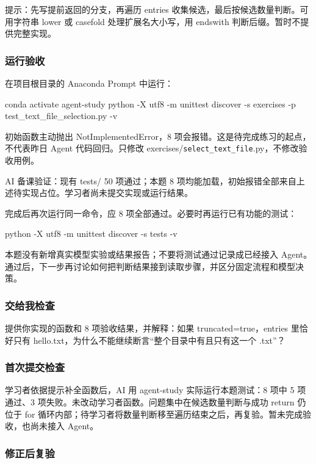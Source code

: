 \documentclass[UTF8,zihao=-4,fontset=fandol]{ctexart}
\begin{document}
提示：先写提前返回的分支，再遍历 entries 收集候选，最后按候选数量判断。可用字符串 lower 或 casefold 处理扩展名大小写，用 endswith 判断后缀。暂时不提供完整实现。

\subsubsection{运行验收}

在项目根目录的 Anaconda Prompt 中运行：

\begin{Code}
conda activate agent-study
python -X utf8 -m unittest discover -s exercises -p test_text_file_selection.py -v
\end{Code}

初始函数主动抛出 NotImplementedError，8 项会报错。这是待完成练习的起点，不代表昨日 Agent 代码回归。只修改 exercises/\nolinkurl{select_text_file}.py，不修改验收用例。

AI 备课验证：现有 tests/ 50 项通过；本题 8 项均能加载，初始报错全部来自上述待实现占位。学习者尚未提交实现或运行结果。

完成后再次运行同一命令，应 8 项全部通过。必要时再运行已有功能的测试：

\begin{Code}
python -X utf8 -m unittest discover -s tests -v
\end{Code}

本题没有新增真实模型实验或结果报告；不要将测试通过记录成已经接入 Agent。通过后，下一步再讨论如何把判断结果接到读取步骤，并区分固定流程和模型决策。

\subsubsection{交给我检查}

提供你实现的函数和 8 项验收结果，并解释：如果 truncated=true，entries 里恰好只有 hello.txt，为什么不能继续断言“整个目录中有且只有这一个 .txt”？

\subsubsection{首次提交检查}

学习者依据提示补全函数后，AI 用 agent-study 实际运行本题测试：8 项中 5 项通过、3 项失败。未改动学习者函数。问题集中在候选数量判断与成功 return 仍位于 for 循环内部；待学习者将数量判断移至遍历结束之后，再复验。暂未完成验收，也尚未接入 Agent。

\subsubsection{修正后复验}
\end{document}
